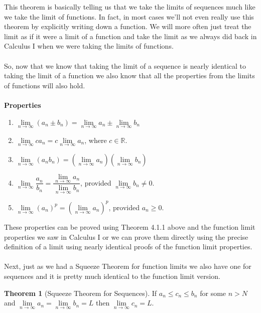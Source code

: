 \documentclass[10pt,reqno]{book}
\theoremstyle{definition}
\newtheorem{theorem}{Theorem}[section]
\def\R{\mathbb{R}}
\begin{document}
	\noindent This theorem is basically telling us that we take the limits of sequences much like we take the limit of functions. In fact, in most cases we'll not even really use this theorem by explicitly writing down a function. We will more often just treat the limit as if it were a limit of a function and take the limit as we always did back in Calculus I when we were taking the limits of functions.\\ \\
	So, now that we know that taking the limit of a sequence is nearly identical to taking the limit of a function we also know that all the properties from the limits of functions will also hold.\\ \\
	\textbf{Properties}
	
	\begin{enumerate}
		\item $ \lim\limits_{n \to \infty} (a_n \pm b_n) = \lim\limits_{n \to \infty} a_n \pm \lim\limits_{n \to \infty} b_n $
		
		\item $  \lim\limits_{n \to \infty} c a_n = c \lim\limits_{n \to \infty} a_n $, where $ c \in \R $.
		
		\item $ \lim\limits_{n \to \infty} (a_n b_n) = \left( \lim\limits_{n \to \infty} a_n \right) \left( \lim\limits_{n \to \infty} b_n\right) $
		
		\item $ \lim\limits_{n \to \infty} \dfrac{a_n}{b_n} = \dfrac{\lim\limits_{n \to \infty} a_n}{\lim\limits_{n \to \infty} b_n} $, provided $ \lim\limits_{n \to \infty} b_n \neq 0 $.
		
		\item $ \lim\limits_{n \to \infty} (a_n)^p = \left( \lim\limits_{n \to \infty} a_n \right)^p $, provided $ a_n \geq 0 $.
	\end{enumerate}
	These properties can be proved using Theorem 4.1.1 above and the function limit properties we saw in Calculus I or we can prove them directly using the precise definition of a limit using nearly identical proofs of the function limit properties.\\ \\ 
	Next, just as we had a Squeeze Theorem for function limits we also have one for sequences and it is pretty much identical to the function limit version.
	\begin{theorem}[Squeeze Theorem for Sequences]
		If $ a_n  \leq c_n \leq b_n $ for some $ n > N $ and $ \lim\limits_{n \to \infty} a_n = \lim\limits_{n \to \infty} b_n = L $ then $ \lim\limits_{n \to \infty} c_n = L $.
	\end{theorem}
\end{document}
